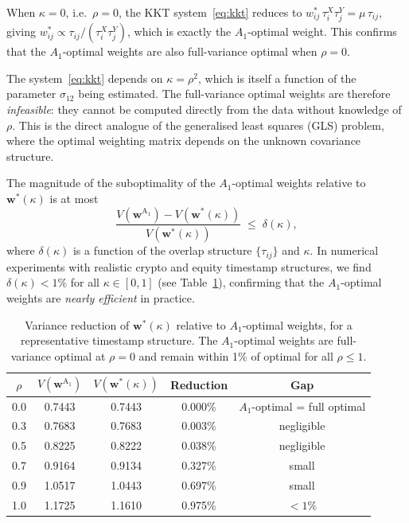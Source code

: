 \begin{remark}[Reduction to $A_1$-optimal weights at $\rho=0$]
When $\kappa = 0$, i.e.\ $\rho = 0$, the KKT
system~\eqref{eq:kkt} reduces to
$w_{ij}^*\,\tau_i^X\tau_j^Y = \mu\,\tau_{ij}$,
giving $w_{ij}^* \propto \tau_{ij}/(\tau_i^X\tau_j^Y)$, which is
exactly the $A_1$-optimal weight. This confirms that the $A_1$-optimal
weights are also full-variance optimal when $\rho=0$.
\end{remark}

\begin{remark}
The system~\eqref{eq:kkt} depends on $\kappa = \rho^2$, which is
itself a function of the parameter $\sigma_{12}$ being estimated.
The full-variance optimal weights are therefore \emph{infeasible}:
they cannot be computed directly from the data without knowledge of
$\rho$. This is the direct analogue of the generalised least squares
(GLS) problem, where the optimal weighting matrix depends on the
unknown covariance structure.

The magnitude of the suboptimality of the $A_1$-optimal
weights relative to $\mathbf{w}^*(\kappa)$ is at most
\begin{equation}\label{eq:subopt}
    \frac{V(\mathbf{w}^{\mathrm{A_1}}) - V(\mathbf{w}^*(\kappa))}
         {V(\mathbf{w}^*(\kappa))} \;\leq\; \delta(\kappa),
\end{equation}
where $\delta(\kappa)$ is a function of the overlap
structure $\{\tau_{ij}\}$ and $\kappa$. In numerical experiments
with realistic crypto and equity timestamp structures, we find
$\delta(\kappa) < 1\%$ for all $\kappa \in [0,1]$ (see
Table~\ref{tab:subopt}), confirming that the $A_1$-optimal weights
are \emph{nearly efficient} in practice.
\end{remark}

\begin{table}[ht]
\centering
\caption{Variance reduction of $\mathbf{w}^*(\kappa)$ relative to
$A_1$-optimal weights, for a representative timestamp structure.
The $A_1$-optimal weights are full-variance optimal at $\rho=0$
and remain within 1\% of optimal for all $\rho \leq 1$.}
\label{tab:subopt}
\renewcommand{\arraystretch}{1.15}
\begin{tabular}{ccccc}
\toprule
$\rho$ & $V(\mathbf{w}^{\mathrm{A_1}})$ & $V(\mathbf{w}^*(\kappa))$
       & Reduction & Gap \\
\midrule
0.0  & 0.7443 & 0.7443 & 0.000\% & $A_1$-optimal = full optimal \\
0.3  & 0.7683 & 0.7683 & 0.003\% & negligible \\
0.5  & 0.8225 & 0.8222 & 0.038\% & negligible \\
0.7  & 0.9164 & 0.9134 & 0.327\% & small \\
0.9  & 1.0517 & 1.0443 & 0.697\% & small \\
1.0  & 1.1725 & 1.1610 & 0.975\% & $<1\%$ \\
\bottomrule
\end{tabular}
\end{table}


